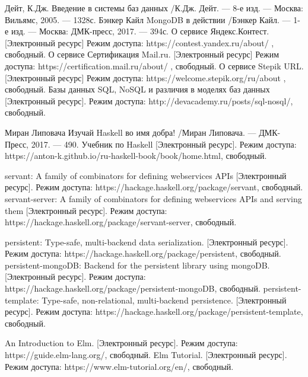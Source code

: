 
\begin{thebibliography}{9}
	  Дейт, К.Дж. Введение в системы баз данных /К.Дж. Дейт. — 8-е изд. — Москва: Вильямс, 2005. — 1328с.
	  Бэнкер Кайл MongoDB в действии /Бэнкер Кайл. — 1-е изд. — Москва: ДМК-пресс, 2017. — 394с.
	  О сервисе Яндекс.Контест. [Электронный ресурс] Режим доступа: https://contest.yandex.ru/about/ , свободный.
	  О сервисе Сертификация Mail.ru. [Электронный ресурс] Режим доступа: https://certification.mail.ru/about/ , свободный.
	  О сервисе Stepik URL.  [Электронный ресурс] Режим доступа: https://welcome.stepik.org/ru/about , свободный.
	  Базы данных SQL, NoSQL и различия в моделях баз данных [Электронный ресурс]. Режим доступа: http://devacademy.ru/posts/sql-nosql/, свободный.
	 
	  Миран Липовача Изучай Haskell во имя добра! /Миран Липовача. — ДМК-Пресс, 2017. — 490.
	  Учебник по Haskell [Электронный ресурс]. Режим доступа: https://anton-k.github.io/ru-haskell-book/book/home.html, свободный.
	 
	  servant: A family of combinators for defining webservices APIs [Электронный ресурс]. Режим доступа: https://hackage.haskell.org/package/servant, свободный.
	  servant-server: A family of combinators for defining webservices APIs and serving them [Электронный ресурс]. Режим доступа: https://hackage.haskell.org/package/servant-server, свободный.
	 
	  persistent: Type-safe, multi-backend data serialization. [Электронный ресурс]. Режим доступа: https://hackage.haskell.org/package/persistent, свободный.
	  persistent-mongoDB: Backend for the persistent library using mongoDB. [Электронный ресурс]. Режим доступа: https://hackage.haskell.org/package/persistent-mongoDB, свободный.
	  persistent-template: Type-safe, non-relational, multi-backend persistence. [Электронный ресурс]. Режим доступа: https://hackage.haskell.org/package/persistent-template, свободный.
	 
	 
	  An Introduction to Elm. [Электронный ресурс]. Режим доступа: https://guide.elm-lang.org/, свободный.
	  Elm Tutorial. [Электронный ресурс]. Режим доступа: https://www.elm-tutorial.org/en/, свободный.
	 
\end{thebibliography}